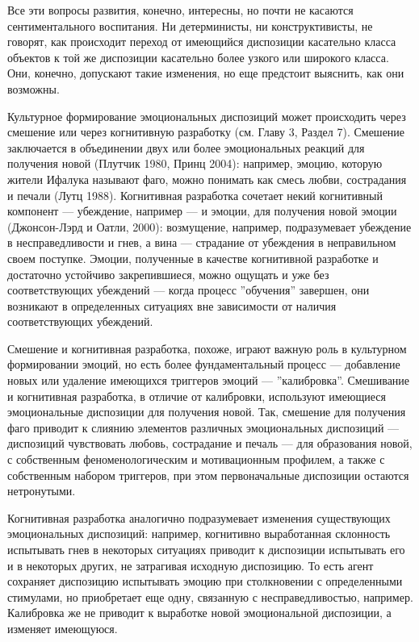 \documentclass[11pt]{book}
\begin{document}
Все эти вопросы развития, конечно, интересны, но почти не касаются сентиментального воспитания. Ни детерминисты, ни конструктивисты, не говорят, как происходит переход от имеющийся диспозиции касательно класса объектов к той же диспозиции касательно более узкого или широкого класса. Они, конечно, допускают такие изменения, но еще предстоит выяснить, как они возможны.

Культурное формирование эмоциональных диспозиций может происходить через смешение или через когнитивную разработку (см. Главу 3, Раздел 7). Смешение заключается в объединении двух или более эмоциональных реакций для получения новой (Плутчик 1980, Принц 2004): например, эмоцию, которую жители Ифалука называют фаго, можно понимать как смесь любви, сострадания и печали (Лутц 1988). Когнитивная разработка сочетает некий когнитивный компонент --- убеждение, например --- и эмоции, для получения новой эмоции (Джонсон-Лэрд и Оатли, 2000): возмущение, например, подразумевает убеждение в несправедливости и гнев, а вина --- страдание от убеждения в неправильном своем поступке. Эмоции, полученные в качестве когнитивной разработке и достаточно устойчиво закрепившиеся, можно ощущать и уже без соответствующих убеждений --- когда процесс ''обучения'' завершен, они возникают в определенных ситуациях вне зависимости от наличия соответствующих убеждений.

Смешение и когнитивная разработка, похоже, играют важную роль в культурном формировании эмоций, но есть более фундаментальный процесс --- добавление новых или удаление имеющихся триггеров эмоций --- ''калибровка''. Смешивание и когнитивная разработка, в отличие от калибровки, используют имеющиеся эмоциональные диспозиции для получения новой. Так, смешение для получения фаго приводит к слиянию элементов различных эмоциональных диспозиций --- диспозиций чувствовать любовь, сострадание и печаль --- для образования новой, с собственным феноменологическим и мотивационным профилем, а также с собственным набором триггеров, при этом первоначальные диспозиции остаются нетронутыми.

Когнитивная разработка аналогично подразумевает изменения существующих эмоциональных диспозиций: например, когнитивно выработанная склонность испытывать гнев в некоторых ситуациях приводит к диспозиции испытывать его и в некоторых других, не затрагивая исходную диспозицию. То есть агент сохраняет диспозицию испытывать эмоцию при столкновении с определенными стимулами, но приобретает еще одну, связанную с несправедливостью, например. Калибровка же не приводит к выработке новой эмоциональной диспозиции, а изменяет имеющуюся.
\end{document}
